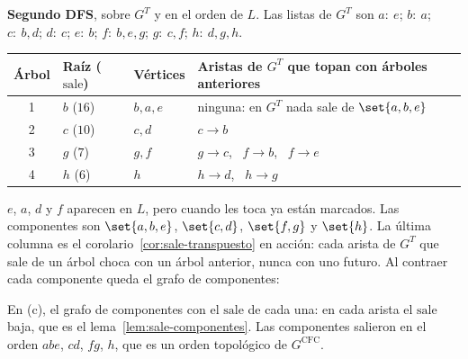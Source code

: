 \documentclass[11pt,letterpaper]{article}
\begin{document}
\begin{ejemplo}
  \textbf{Segundo DFS}, sobre $G^T$ y en el orden de $L$. Las listas
  de $G^T$ son $a{:}\ e$; $b{:}\ a$; $c{:}\ b, d$; $d{:}\ c$;
  $e{:}\ b$; $f{:}\ b, e, g$; $g{:}\ c, f$; $h{:}\ d, g, h$.
  \begin{center}
  \small
  \begin{tabular}{clll}
    \toprule
    \textbf{Árbol} & \textbf{Raíz ($\text{sale}$)} & \textbf{Vértices}
      & \textbf{Aristas de $G^T$ que topan con árboles anteriores} \\
    \midrule
    1 & $b$ ($16$) & $b, a, e$ & ninguna: en $G^T$ nada sale de
      $\set{a, b, e}$ \\
    2 & $c$ ($10$) & $c, d$ & $c \to b$ \\
    3 & $g$ ($7$) & $g, f$ & $g \to c$, \ $f \to b$, \ $f \to e$ \\
    4 & $h$ ($6$) & $h$ & $h \to d$, \ $h \to g$ \\
    \bottomrule
  \end{tabular}
  \end{center}
  $e$, $a$, $d$ y $f$ aparecen en $L$, pero cuando les toca ya están
  marcados. Las componentes son $\set{a, b, e}$, $\set{c, d}$,
  $\set{f, g}$ y $\set{h}$. La última columna es el
  corolario~\ref{cor:sale-transpuesto} en acción: cada arista de $G^T$
  que sale de un árbol choca con un árbol anterior, nunca con uno
  futuro. Al contraer cada componente queda el grafo de componentes:
  \begin{center}
  \end{center}
  En (c), el grafo de componentes con el $\text{sale}$ de cada una: en
  cada arista el $\text{sale}$ baja, que es el
  lema~\ref{lem:sale-componentes}. Las componentes salieron en el orden
  $abe$, $cd$, $fg$, $h$, que es un orden topológico de
  $G^{\text{CFC}}$.
\end{ejemplo}
\end{document}
